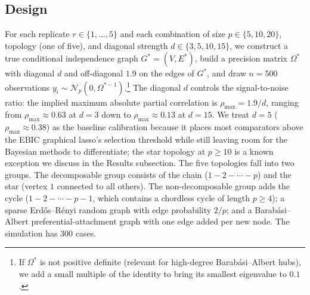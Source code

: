 \subsection{Design}

For each replicate $r \in \{1, \dots, 5\}$ and each combination of size $p \in \{5, 10, 20\}$, topology (one of five), and diagonal strength $d \in \{3, 5, 10, 15\}$, we construct a true conditional independence graph $G^* = (V, E^*)$, build a precision matrix $\Omega^*$ with diagonal $d$ and off-diagonal $1.9$ on the edges of $G^*$, and draw $n = 500$ observations $y_i \sim \mathcal{N}_p(0, \Omega^{*-1})$.\footnote{If $\Omega^*$ is not positive definite (relevant for high-degree Barab\'asi--Albert hubs), we add a small multiple of the identity to bring its smallest eigenvalue to $0.1$.} The diagonal $d$ controls the signal-to-noise ratio: the implied maximum absolute partial correlation is $\rho_{\max} = 1.9 / d$, ranging from $\rho_{\max} \approx 0.63$ at $d = 3$ down to $\rho_{\max} \approx 0.13$ at $d = 15$. 
We treat $d = 5$ ($\rho_{\max} \approx 0.38$) as the baseline calibration because it places most comparators above the EBIC graphical lasso's selection threshold while still leaving room for the Bayesian methods to differentiate; the star topology at $p \geq 10$ is a known exception we discuss in the Results subsection.
The five topologies fall into two groups. The decomposable group consists of the chain ($1\!-\!2\!-\!\cdots\!-\!p$) and the star (vertex $1$ connected to all others). The non-decomposable group adds the cycle ($1\!-\!2\!-\!\cdots\!-\!p\!-\!1$, which contains a chordless cycle of length $p \geq 4$); a sparse Erd\H{o}s--R\'enyi random graph with edge probability $2/p$; and a Barab\'asi--Albert preferential-attachment graph with one edge added per new node. The simulation has $300$ cases.

